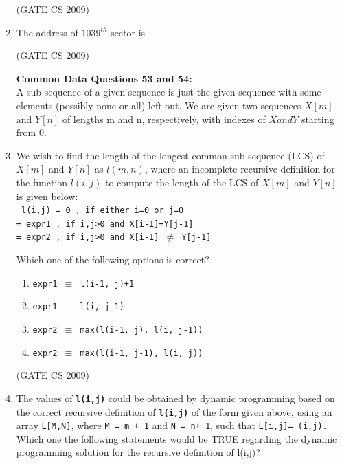\documentclass[a4paper, 11pt]{article}
\begin{document}
\begin{enumerate}
    \hfill (GATE CS 2009)

    \item The address of $1039^{th}$ sector is
    \begin{enumerate}
    \end{enumerate}
    
    \hfill (GATE CS 2009)

    \large\textbf{Common Data Questions 53 and 54:}\\
    A sub-sequence of a given sequence is just the given sequence with some elements (possibly none or all) left out. We are given two sequences $X [m]$ and $Y [n]$ of lengths m and n, respectively, with indexes of $X and Y$ starting from 0.
    \item We wish to find the length of the longest common sub-sequence (LCS) of $X[m]$ and $Y[n]$ as $l(m, n)$, where an incomplete recursive definition for the function $l(i, j)$ to compute the length of the LCS of $X[m]$ and $Y[n]$ is given below:\\
    
        \texttt{ l(i,j) = 0 , if either i=0 or j=0\\ 
        = expr1 , if i,j>0 and X[i-1]=Y[j-1]\\ 
        = expr2 , if i,j>0 and X[i-1] $\neq$ Y[j-1]}

    Which one of the following options is correct?
    \begin{enumerate} 
        \item  \texttt{expr1 $\equiv$ l(i-1, j)+1}
        \item  \texttt{expr1 $\equiv$ l(i, j-1)}
        \item  \texttt{expr2 $\equiv$ max(l(i-1, j), l(i, j-1))}
        \item  \texttt{expr2 $\equiv$ max(l(i-1, j-1), l(i, j))}

    \end{enumerate}

    \hfill (GATE CS 2009)

    \item The values of \texttt{\textbf{l(i,j)}} could be obtained by dynamic programming based on the correct recursive definition of \texttt{\textbf{l(i,j)}} of the form given above, using an array \texttt{L[M,N]}, where \texttt{M = m + 1} and \texttt{N = n+ 1}, such that \texttt{L[i,j]= (i,j).}\\
    Which one the following statements would be TRUE regarding the dynamic programming solution for the recursive definition of l(i,j)?


\end{enumerate}
\end{document}
